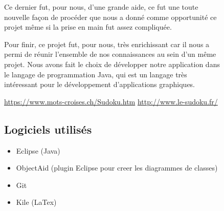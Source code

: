 \begin{figure}[ht]
Ce dernier fut, pour nous, d'une grande aide, ce fut une toute nouvelle façon de 
procéder que nous a donné comme opportunité ce projet même si la prise en main 
fut assez compliquée.

Pour finir, ce projet fut, pour nous, très enrichissant car il nous a permi de réunir
l'ensemble de nos connaissances au sein d'un même projet. Nous avons fait le choix 
de développer notre application dans le langage de programmation Java, qui est un langage
très intéressant pour le développement d'applications graphiques.

\begin{thebibliography}{9}
          \url{https://www.mots-croises.ch/Sudoku.htm}
          \url{http://www.le-sudoku.fr/}
\end{thebibliography}

\subsection*{Logiciels utilisés}
\begin{itemize}
\item Eclipse (Java)
\item ObjectAid (plugin Eclipse pour creer les diagrammes de classes)
\item Git
\item Kile (LaTex)
\end{itemize}


\end{figure}
